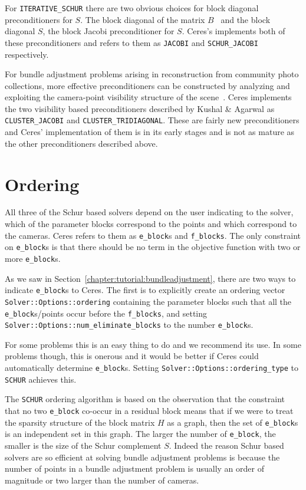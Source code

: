 For \texttt{ITERATIVE\_SCHUR} there are two obvious choices for block diagonal preconditioners for $S$. The block diagonal of the matrix $B$~\cite{mandel1990block} and the block diagonal $S$, \ie the block Jacobi preconditioner for $S$. Ceres's implements both of these preconditioners and refers to them as  \texttt{JACOBI} and \texttt{SCHUR\_JACOBI} respectively.

For bundle adjustment problems arising in reconstruction from community photo collections, more effective preconditioners can be constructed by analyzing and exploiting the camera-point visibility structure of the scene~\cite{kushal2012}. Ceres implements the two visibility based preconditioners described by Kushal \& Agarwal as \texttt{CLUSTER\_JACOBI} and \texttt{CLUSTER\_TRIDIAGONAL}. These are fairly new preconditioners and Ceres' implementation of them is in its early stages and is not as mature as the other preconditioners described above.

\section{Ordering}
All three of the Schur based solvers depend on the user indicating to the solver, which of the parameter blocks correspond to the points and which correspond to the cameras. Ceres refers to them as \texttt{e\_block}s and \texttt{f\_blocks}. The only constraint on \texttt{e\_block}s is that there should be no term in the objective function with two or more \texttt{e\_block}s.

As we saw in Section~\ref{chapter:tutorial:bundleadjustment}, there are two ways to indicate \texttt{e\_block}s to Ceres. The first is to explicitly create an ordering vector \texttt{Solver::Options::ordering} containing the parameter blocks such that all the \texttt{e\_block}s/points occur before the \texttt{f\_blocks}, and setting \texttt{Solver::Options::num\_eliminate\_blocks} to the number \texttt{e\_block}s.

For some problems this is an easy thing to do and we recommend its use. In some problems though, this is onerous and it would be better if Ceres could automatically determine \texttt{e\_block}s. Setting \texttt{Solver::Options::ordering\_type} to \texttt{SCHUR} achieves this.

The \texttt{SCHUR} ordering algorithm is based on the observation that
the constraint that no two \texttt{e\_block} co-occur in a residual
block means that if we were to treat the sparsity structure of the
block matrix $H$ as a graph, then the set of \texttt{e\_block}s is an
independent set in this graph. The larger the number of
\texttt{e\_block}, the smaller is the size of the Schur complement $S$. Indeed the reason Schur based solvers are so efficient at solving bundle adjustment problems is because the number of points in a bundle adjustment problem is usually an order of magnitude or two larger than the number of cameras.

